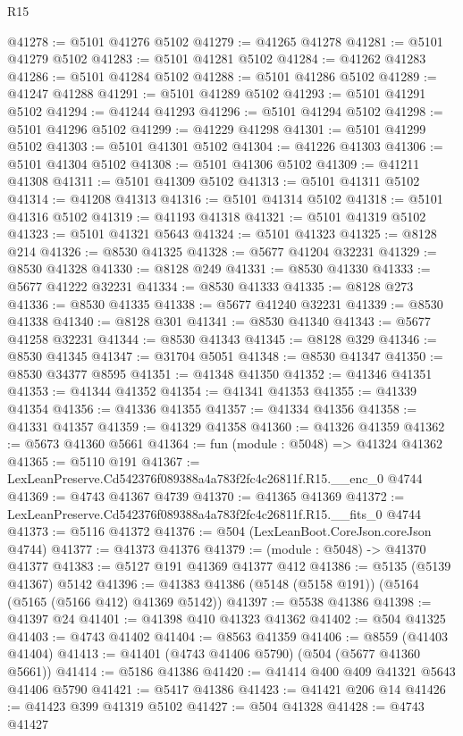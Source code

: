\begin{lexlean}{R15}
\begin{coremodule}
{{{{{{{{{{{@41278 := @5101 @41276 @5102
@41279 := @41265 @41278
@41281 := @5101 @41279 @5102
@41283 := @5101 @41281 @5102
@41284 := @41262 @41283
@41286 := @5101 @41284 @5102
@41288 := @5101 @41286 @5102
@41289 := @41247 @41288
@41291 := @5101 @41289 @5102
@41293 := @5101 @41291 @5102
@41294 := @41244 @41293
@41296 := @5101 @41294 @5102
@41298 := @5101 @41296 @5102
@41299 := @41229 @41298
@41301 := @5101 @41299 @5102
@41303 := @5101 @41301 @5102
@41304 := @41226 @41303
@41306 := @5101 @41304 @5102
@41308 := @5101 @41306 @5102
@41309 := @41211 @41308
@41311 := @5101 @41309 @5102
@41313 := @5101 @41311 @5102
@41314 := @41208 @41313
@41316 := @5101 @41314 @5102
@41318 := @5101 @41316 @5102
@41319 := @41193 @41318
@41321 := @5101 @41319 @5102
@41323 := @5101 @41321 @5643
@41324 := @5101 @41323
@41325 := @8128 @214
@41326 := @8530 @41325
@41328 := @5677 @41204 @32231
@41329 := @8530 @41328
@41330 := @8128 @249
@41331 := @8530 @41330
@41333 := @5677 @41222 @32231
@41334 := @8530 @41333
@41335 := @8128 @273
@41336 := @8530 @41335
@41338 := @5677 @41240 @32231
@41339 := @8530 @41338
@41340 := @8128 @301
@41341 := @8530 @41340
@41343 := @5677 @41258 @32231
@41344 := @8530 @41343
@41345 := @8128 @329
@41346 := @8530 @41345
@41347 := @31704 @5051
@41348 := @8530 @41347
@41350 := @8530 @34377 @8595
@41351 := @41348 @41350
@41352 := @41346 @41351
@41353 := @41344 @41352
@41354 := @41341 @41353
@41355 := @41339 @41354
@41356 := @41336 @41355
@41357 := @41334 @41356
@41358 := @41331 @41357
@41359 := @41329 @41358
@41360 := @41326 @41359
@41362 := @5673 @41360 @5661
@41364 := fun (module : @5048) => @41324 @41362
@41365 := @5110 @191
@41367 := LexLeanPreserve.Cd542376f089388a4a783f2fc4c26811f.R15.__enc_0 @4744
@41369 := @4743 @41367 @4739
@41370 := @41365 @41369
@41372 := LexLeanPreserve.Cd542376f089388a4a783f2fc4c26811f.R15.__fits_0 @4744
@41373 := @5116 @41372
@41376 := @504 (LexLeanBoot.CoreJson.coreJson @4744)
@41377 := @41373 @41376
@41379 := (module : @5048) -> @41370 @41377
@41383 := @5127 @191 @41369 @41377 @412
@41386 := @5135 (@5139 @41367) @5142
@41396 := @41383 @41386 (@5148 (@5158 @191)) (@5164 (@5165 (@5166 @412) @41369 @5142))
@41397 := @5538 @41386
@41398 := @41397 @24
@41401 := @41398 @410 @41323 @41362
@41402 := @504 @41325
@41403 := @4743 @41402
@41404 := @8563 @41359
@41406 := @8559 (@41403 @41404)
@41413 := @41401 (@4743 @41406 @5790) (@504 (@5677 @41360 @5661))
@41414 := @5186 @41386
@41420 := @41414 @400 @409 @41321 @5643 @41406 @5790
@41421 := @5417 @41386
@41423 := @41421 @206 @14
@41426 := @41423 @399 @41319 @5102
@41427 := @504 @41328
@41428 := @4743 @41427
}}}}}}}}}}}
\end{coremodule}
\end{lexlean}
